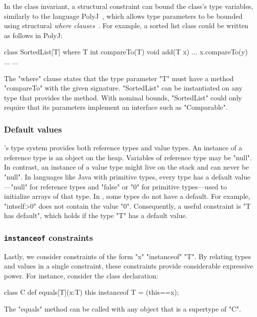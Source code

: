 In the class invariant, a structural constraint can bound the
class's type variables, similarly to 
the language PolyJ~\cite{java-popl97}, which allows type
parameters to be
bounded using
structural \emph{where clauses}~\cite{where-clauses}.
For example, a sorted list class
could be written as follows in PolyJ:
{
\begin{xtennoindent}
class SortedList[T] where T {int compareTo(T)} {
  void add(T x) {... x.compareTo(y) ...}
  ...
}
\end{xtennoindent}}
The \xcd"where" clause states that the type parameter
\xcd"T" must have a
method \xcd"compareTo" with the given signature.
\xcd"SortedList" can be instantiated on any type
that provides the method.
With nominal bounds, \xcd"SortedList" could only require that
its parameters implement an interface such as \xcd"Comparable".

\subsubsection{Default values}

\Xten's type system provides both reference types and value
types.  An instance of a reference type is an object on the
heap.  Variables of reference type may be \xcd"null".
In contrast, an instance of a value type might live on the stack
and can never be \xcd"null".  In languages like Java with
primitive types, every type has a default value---\xcd"null" for
reference types and \xcd"false" or \xcd"0" for primitive
types---used to initialize arrays of that type.
In \Xten, some types do not have a default.  For example,
\xcd"int{self>0}" does not contain the value \xcd"0".
Consequently, a useful constraint is \xcd"T has default", which
holds if the type \xcd"T" has a default value.

\subsubsection{{\tt instanceof} constraints}

Lastly, we consider constraints of the form \xcd"x" \xcd"instanceof" \xcd"T".
By relating types and values in a single constraint, 
these constraints provide considerable expressive power.
For instance, 
consider the class declaration:
\begin{xtennoindent}
class C {
  def equals[T](x:T) {this instanceof T} = (this==x);
}
\end{xtennoindent}
The \xcd"equals" method can be called with any object
that is a supertype of \xcd"C".

